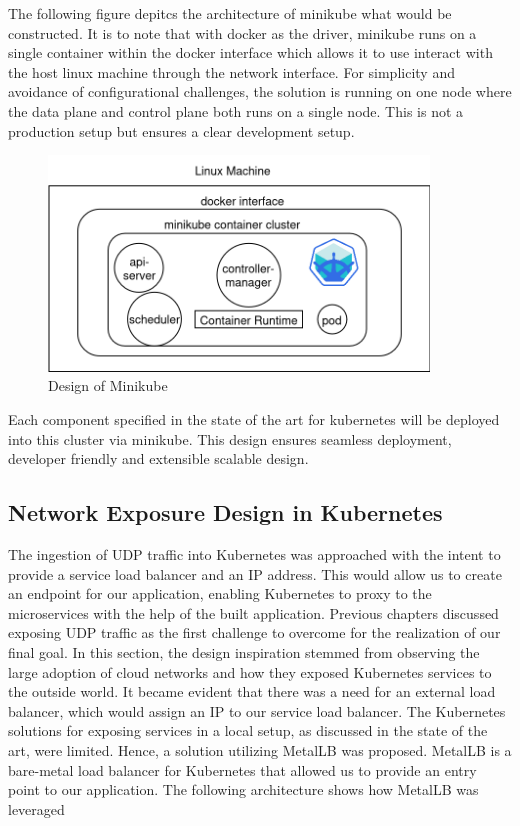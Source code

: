The following figure depitcs the architecture of minikube what would be constructed. It is to note that with docker as the driver, minikube runs on a single container within the docker interface which allows it to use interact with the host linux machine through the network interface. For simplicity and avoidance of configurational challenges, the solution is running on one node where the data plane and control plane both runs on a single node. This is not a production setup but ensures a clear development setup.

\begin{figure}[H]
\caption{Design of Minikube}
\centering
\includegraphics[width=0.9\textwidth]{Design/minikube_driver.png}
\end{figure}

Each component specified in the state of the art for kubernetes will be deployed into this cluster via minikube. This design ensures seamless deployment, developer friendly and extensible scalable design.


\subsection{Network Exposure Design in Kubernetes}
The ingestion of UDP traffic into Kubernetes was approached with the intent to provide a service load balancer and an IP address. This would allow us to create an endpoint for our application, enabling Kubernetes to proxy to the microservices with the help of the built application. Previous chapters discussed exposing UDP traffic as the first challenge to overcome for the realization of our final goal. In this section, the design inspiration stemmed from observing the large adoption of cloud networks and how they exposed Kubernetes services to the outside world. It became evident that there was a need for an external load balancer, which would assign an IP to our service load balancer. The Kubernetes solutions for exposing services in a local setup, as discussed in the state of the art, were limited. Hence, a solution utilizing MetalLB was proposed. MetalLB is a bare-metal load balancer for Kubernetes that allowed us to provide an entry point to our application. The following architecture shows how MetalLB was leveraged



